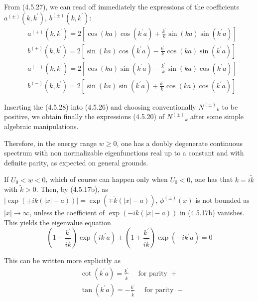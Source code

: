\documentclass{article}
\begin{document}
From (4.5.27), we can read off immediately the expressions of the coefficients $a^{( \pm)}\left(k, k^{\prime}\right)$, $b^{( \pm)}\left(k, k^{\prime}\right):$
$$
\begin{align*}
& a^{(+)}\left(k, k^{\prime}\right)=2\left[\cos (k a) \cos \left(k^{\prime} a\right)+\frac{k^{\prime}}{k} \sin (k a) \sin \left(k^{\prime} a\right)\right]  \tag{4.5.28a}\\
& b^{(+)}\left(k, k^{\prime}\right)=2\left[\sin (k a) \cos \left(k^{\prime} a\right)-\frac{k^{\prime}}{k} \cos (k a) \sin \left(k^{\prime} a\right)\right]  \tag{4.5.28b}\\
& a^{(-)}\left(k, k^{\prime}\right)=2\left[\cos (k a) \sin \left(k^{\prime} a\right)-\frac{k^{\prime}}{k} \sin (k a) \cos \left(k^{\prime} a\right)\right]  \tag{4.5.28c}\\
& b^{(-)}\left(k, k^{\prime}\right)=2\left[\sin (k a) \sin \left(k^{\prime} a\right)+\frac{k^{\prime}}{k} \cos (k a) \cos \left(k^{\prime} a\right)\right] \tag{4.5.28d}
\end{align*}
$$

Inserting the (4.5.28) into (4.5.26) and choosing conventionally $N^{( \pm)}{ }_{k}$ to be positive, we obtain finally the expressions (4.5.20) of $N^{( \pm)}{ }_{k}$ after some simple algebraic manipulations.

Therefore, in the energy range $w \geq 0$, one has a doubly degenerate continuous spectrum with non normalizable eigenfunctions real up to a constant and with definite parity, as expected on general grounds.

If $U_{0}<w<0$, which of course can happen only when $U_{0}<0$, one has that $k=i \tilde{k}$ with $\tilde{k}>0$. Then, by (4.5.17b), as $|\exp ( \pm i k(|x|-a))|=\exp (\mp \tilde{k}(|x|-a))$, $\phi^{( \pm)}(x)$ is not bounded as $|x| \rightarrow \infty$, unless the coefficient of $\exp (-i k(|x|-a))$ in (4.5.17b) vanishes. This yields the eigenvalue equation
$$
\begin{equation*}
\left(1-\frac{k^{\prime}}{i \tilde{k}}\right) \exp \left(i k^{\prime} a\right) \pm\left(1+\frac{k^{\prime}}{i \tilde{k}}\right) \exp \left(-i k^{\prime} a\right)=0 \tag{4.5.29}
\end{equation*}
$$

This can be written more explicitly as
$$
\begin{align*}
& \cot \left(k^{\prime} a\right)=\frac{k^{\prime}}{\tilde{k}} \quad \text { for parity }+  \tag{4.5.30a}\\
& \tan \left(k^{\prime} a\right)=-\frac{k^{\prime}}{\tilde{k}} \quad \text { for parity }- \tag{4.5.30b}
\end{align*}
$$
\end{document}

